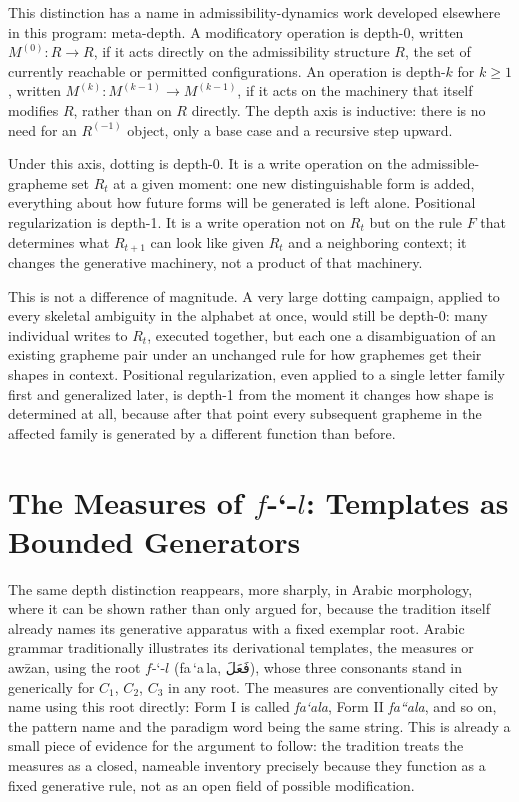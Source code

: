\documentclass[11pt]{article}
\newcommand{\ar}[1]{\textarabic{#1}}
\begin{document}
This distinction has a name in admissibility-dynamics work developed
elsewhere in this program: meta-depth. A modificatory operation is depth-0,
written $M^{(0)}: R \to R$, if it acts directly on the admissibility
structure $R$, the set of currently reachable or permitted configurations.
An operation is depth-$k$ for $k \geq 1$, written $M^{(k)}: M^{(k-1)} \to
M^{(k-1)}$, if it acts on the machinery that itself modifies $R$, rather than
on $R$ directly. The depth axis is inductive: there is no need for an
$R^{(-1)}$ object, only a base case and a recursive step upward.

Under this axis, dotting is depth-0. It is a write operation on the
admissible-grapheme set $R_t$ at a given moment: one new distinguishable
form is added, everything about how future forms will be generated is left
alone. Positional regularization is depth-1. It is a write operation not on
$R_t$ but on the rule $F$ that determines what $R_{t+1}$ can look like given
$R_t$ and a neighboring context; it changes the generative machinery, not a
product of that machinery.

This is not a difference of magnitude. A very large dotting campaign, applied
to every skeletal ambiguity in the alphabet at once, would still be depth-0:
many individual writes to $R_t$, executed together, but each one a
disambiguation of an existing grapheme pair under an unchanged rule for how
graphemes get their shapes in context. Positional regularization, even
applied to a single letter family first and generalized later, is depth-1
from the moment it changes how shape is determined at all, because after
that point every subsequent grapheme in the affected family is generated by
a different function than before.

\section{The Measures of $f$-`-$l$: Templates as Bounded Generators}

The same depth distinction reappears, more sharply, in Arabic morphology,
where it can be shown rather than only argued for, because the tradition
itself already names its generative apparatus with a fixed exemplar root.
Arabic grammar traditionally illustrates its derivational templates, the
measures or aw\=zan, using the root $f$-`-$l$ (fa\,`a\,la, \ar{فَعَلَ}), whose three
consonants stand in generically for $C_1$, $C_2$, $C_3$ in any root. The
measures are conventionally cited by name using this root directly: Form I
is called \emph{fa`ala}, Form II \emph{fa``ala}, and so on, the pattern name
and the paradigm word being the same string. This is already a small piece
of evidence for the argument to follow: the tradition treats the measures as
a closed, nameable inventory precisely because they function as a fixed
generative rule, not as an open field of possible modification.
\end{document}
